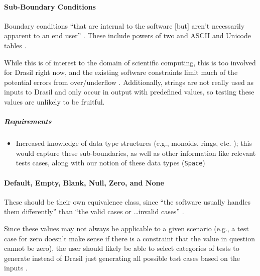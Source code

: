 \paragraph{Sub-Boundary Conditions \cite[p.~75-77]{patton_software_2006}}
\label{sub-bound-conds}

Boundary conditions ``that are internal to the software [but] aren't necessarily
apparent to an end user'' \cite[p.~75]{patton_software_2006}. These include
powers of two \cite[p.~75-76]{patton_software_2006} and ASCII and Unicode tables
\cite[p.~76-77]{patton_software_2006}.

While this is of interest to the domain of scientific computing, this is too
involved for Drasil right now, and the existing software constraints limit much
of the potential errors from over/underflow \cite{june_11_meeting}. Additionally,
strings are not really used as inputs to Drasil and only occur in output with
predefined values, so testing these values are unlikely to be fruitful.

\subparagraph{Requirements}
\begin{itemize}
      \item Increased knowledge of data type structures (e.g., monoids, rings,
            etc. \cite{june_11_meeting}); this would capture these sub-boundaries,
            as well as other information like relevant tests cases, along with
            our notion of these data types (\texttt{Space})
\end{itemize}

\paragraph{Default, Empty, Blank, Null, Zero, and None
      \cite[p.~77-78]{patton_software_2006}}

These should be their own equivalence class, since ``the software usually
handles them differently'' than ``the valid cases or \dots invalid cases''
\cite[p.~78]{patton_software_2006}.

Since these values may not always be applicable to a given scenario (e.g., a
test case for zero doesn't make sense if there is a constraint that the value
in question cannot be zero), the user should likely be able to select
categories of tests to generate instead of Drasil just generating all possible
test cases based on the inputs \cite{june_11_meeting}.

